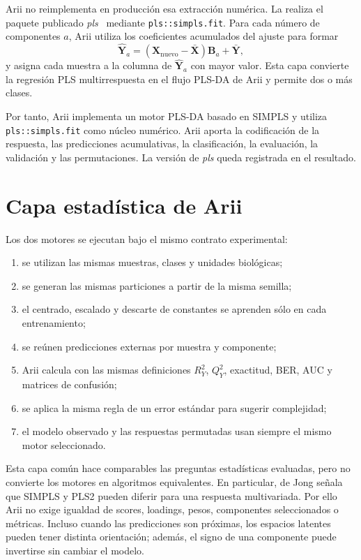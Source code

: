 \documentclass[11pt,a4paper,openany]{report}
\newcommand{\plsPkg}{\textit{pls}}
\newcommand{\code}[1]{\texttt{#1}}
\newcommand{\RtwoY}{R^{2}_{Y}}
\newcommand{\QtwoY}{Q^{2}_{Y}}
\newcommand{\vect}[1]{\boldsymbol{#1}}
\begin{document}
Arii no reimplementa en producción esa extracción numérica. La realiza el paquete publicado \plsPkg{}~\cite{mevik2007} mediante \code{pls::simpls.fit}. Para cada número de componentes $a$, Arii utiliza los coeficientes acumulados del ajuste para formar
\begin{equation}
  \widehat{\vect{Y}}_{a}
  =\left(\vect{X}_{\mathrm{nuevo}}-\bar{\vect{X}}\right)
   \vect{B}_{a}+\bar{\vect{Y}},
\end{equation}
y asigna cada muestra a la columna de $\widehat{\vect{Y}}_{a}$ con mayor valor. Esta capa convierte la regresión PLS multirrespuesta en el flujo PLS-DA de Arii y permite dos o más clases.

Por tanto, Arii implementa un motor PLS-DA basado en SIMPLS y utiliza \code{pls::simpls.fit} como núcleo numérico. Arii aporta la codificación de la respuesta, las predicciones acumulativas, la clasificación, la evaluación, la validación y las permutaciones. La versión de \plsPkg{} queda registrada en el resultado.

\newpage

\section{Capa estadística de Arii}

Los dos motores se ejecutan bajo el mismo contrato experimental:
\begin{enumerate}[leftmargin=*]
  \item se utilizan las mismas muestras, clases y unidades biológicas;
  \item se generan las mismas particiones a partir de la misma semilla;
  \item el centrado, escalado y descarte de constantes se aprenden sólo en cada
  entrenamiento;
  \item se reúnen predicciones externas por muestra y componente;
  \item Arii calcula con las mismas definiciones $\RtwoY$, $\QtwoY$, exactitud,
  BER, AUC y matrices de confusión;
  \item se aplica la misma regla de un error estándar para sugerir complejidad;
  \item el modelo observado y las respuestas permutadas usan siempre el mismo
  motor seleccionado.
\end{enumerate}

Esta capa común hace comparables las preguntas estadísticas evaluadas, pero no convierte los motores en algoritmos equivalentes. En particular, de Jong señala que SIMPLS y PLS2 pueden diferir para una respuesta multivariada. Por ello Arii no exige igualdad de scores, loadings, pesos, componentes seleccionados o métricas. Incluso cuando las predicciones son próximas, los espacios latentes pueden tener distinta orientación; además, el signo de una componente puede invertirse sin cambiar el modelo.
\end{document}

